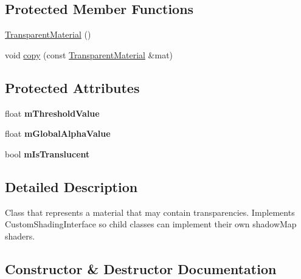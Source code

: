\subsection*{Protected Member Functions}
\begin{DoxyCompactItemize}
\item 
\mbox{\hyperlink{class_geometry_engine_1_1_geometry_material_1_1_transparent_material_ac27f7c3f5604b030abbbfc21cbe31890}{Transparent\+Material}} ()
\item 
void \mbox{\hyperlink{class_geometry_engine_1_1_geometry_material_1_1_transparent_material_a89eaec3ce50fbca5e56edcbe3f3cde6f}{copy}} (const \mbox{\hyperlink{class_geometry_engine_1_1_geometry_material_1_1_transparent_material}{Transparent\+Material}} \&mat)
\end{DoxyCompactItemize}
\subsection*{Protected Attributes}
\begin{DoxyCompactItemize}
\item 
\mbox{\label{class_geometry_engine_1_1_geometry_material_1_1_transparent_material_ad7182a65cc6564b203248f890a165c1d}} 
float {\bfseries m\+Threshold\+Value}
\item 
\mbox{\label{class_geometry_engine_1_1_geometry_material_1_1_transparent_material_a6ad3ebcd85fddb914e1613149cf5bdc2}} 
float {\bfseries m\+Global\+Alpha\+Value}
\item 
\mbox{\label{class_geometry_engine_1_1_geometry_material_1_1_transparent_material_acb52de4a47e810e1f25f267742067c53}} 
bool {\bfseries m\+Is\+Translucent}
\end{DoxyCompactItemize}


\subsection{Detailed Description}
Class that represents a material that may contain transparencies. Implements Custom\+Shading\+Interface so child classes can implement their own shadow\+Map shaders. 

\subsection{Constructor \& Destructor Documentation}
\mbox{\label{class_geometry_engine_1_1_geometry_material_1_1_transparent_material_abbc191aa9453c1279319e53766fd5dc4}} 
